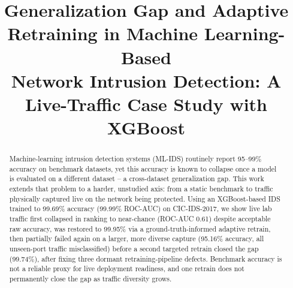 \documentclass[conference]{IEEEtran}
\begin{document}
\title{Generalization Gap and Adaptive Retraining in Machine Learning-Based\\
Network Intrusion Detection: A Live-Traffic Case Study with XGBoost}

\author{
\and
{}
\and
{}
\and
{}
\and
{}
}

\maketitle

\begin{abstract}
Machine-learning intrusion detection systems (ML-IDS) routinely report
95--99\% accuracy on benchmark datasets, yet this accuracy is known to
collapse once a model is evaluated on a different dataset -- a
cross-dataset generalization gap. This work extends that problem to a
harder, unstudied axis: from a static benchmark to traffic physically
captured live on the network being protected. Using an XGBoost-based IDS
trained to 99.69\% accuracy (99.99\% ROC-AUC) on CIC-IDS-2017, we show live
lab traffic first collapsed in ranking to near-chance (ROC-AUC 0.61)
despite acceptable raw accuracy, was restored to 99.95\% via a
ground-truth-informed adaptive retrain, then partially failed again on a
larger, more diverse capture (95.16\% accuracy, all unseen-port traffic
misclassified) before a second targeted retrain closed the gap (99.74\%),
after fixing three dormant retraining-pipeline defects. Benchmark accuracy
is not a reliable proxy for live deployment readiness, and one retrain does
not permanently close the gap as traffic diversity grows.
\end{abstract}
\end{document}
